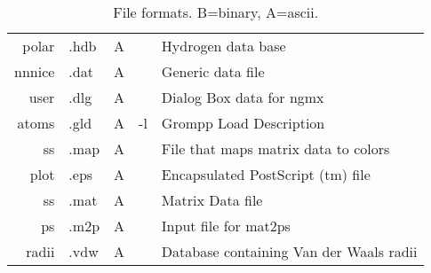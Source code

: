 \begin{table}[p]
\begin{tabularx}{\linewidth}{rlccX}
   polar &  .hdb &   A &       & Hydrogen data base \\
  nnnice &  .dat &   A &       & Generic data file \\
    user &  .dlg &   A &       & Dialog Box data for ngmx \\
   atoms &  .gld &   A &    -l & Grompp Load Description \\
      ss &  .map &   A &       & File that maps matrix data to colors \\
    plot &  .eps &   A &       & Encapsulated PostScript (tm) file \\
      ss &  .mat &   A &       & Matrix Data file \\
      ps &  .m2p &   A &       & Input file for mat2ps \\
   radii &  .vdw &   A &       & Database containing Van der Waals radii \\
\hline
\end{tabularx}
\caption{File formats. B=binary, A=ascii.}
\label{Tab:form}
\end{table}

